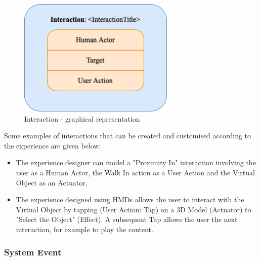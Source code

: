 \begin{figure}[h]
	\centering
	\includegraphics[width=7.5cm]{Figures/Conceptual Model/InteractionBlock.png}
	\caption{Interaction - graphical representation}
	\label{fig:InteractionBlock}
\end{figure}

Some examples of interactions that can be created and customised according to the experience are given below: 
\begin{itemize}
    \item The experience designer can model a "Proximity In" interaction involving the user as a Human Actor, the Walk In action as a User Action and the Virtual Object as an Actuator. 
    \item The experience designed using HMDs allows the user to interact with the Virtual Object by tapping (User Action: Tap) on a 3D Model (Actuator) to "Select the Object" (Effect). A subsequent Tap allows the user the next interaction, for example to play the content. 
\end{itemize}

\subsubsection*{System Event}

